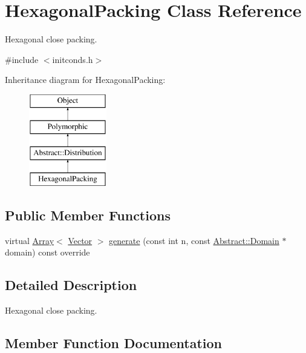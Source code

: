 \hypertarget{classHexagonalPacking}{}\section{Hexagonal\+Packing Class Reference}
\label{classHexagonalPacking}


Hexagonal close packing.  




{\ttfamily \#include $<$initconds.\+h$>$}

Inheritance diagram for Hexagonal\+Packing\+:\begin{figure}[H]
\begin{center}
\leavevmode
\includegraphics[height=4.000000cm]{classHexagonalPacking}
\end{center}
\end{figure}
\subsection*{Public Member Functions}
\begin{DoxyCompactItemize}
\item 
virtual \hyperlink{classArray}{Array}$<$ \hyperlink{classBasicVector}{Vector} $>$ \hyperlink{classHexagonalPacking_a276079137928da5c94f8bb870b038c4a}{generate} (const int n, const \hyperlink{classAbstract_1_1Domain}{Abstract\+::\+Domain} $\ast$domain) const override
\end{DoxyCompactItemize}


\subsection{Detailed Description}
Hexagonal close packing. 

\subsection{Member Function Documentation}
\hypertarget{classHexagonalPacking_a276079137928da5c94f8bb870b038c4a}{}\label{classHexagonalPacking_a276079137928da5c94f8bb870b038c4a} 
